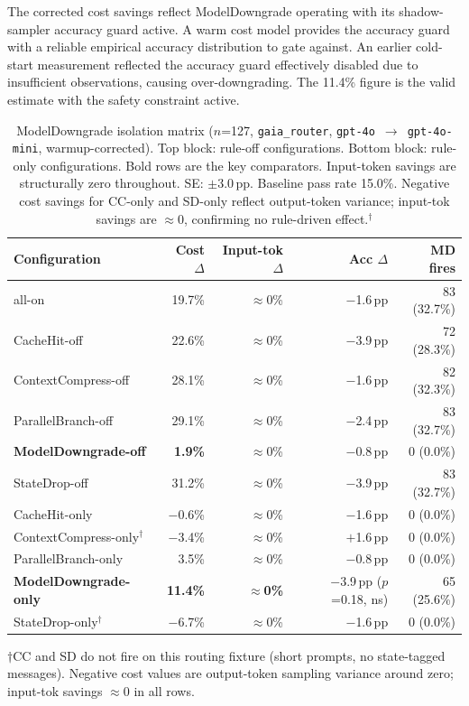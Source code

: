 The corrected cost savings reflect ModelDowngrade operating with its shadow-sampler
accuracy guard active. A warm cost model provides the accuracy guard with a reliable
empirical accuracy distribution to gate against. An earlier cold-start measurement
reflected the accuracy guard effectively disabled due to insufficient observations,
causing over-downgrading. The 11.4\% figure is the valid estimate with the safety
constraint active.

\begin{table}[t]
\caption{ModelDowngrade isolation matrix ($n$=127, \texttt{gaia\_router},
\texttt{gpt-4o}~$\rightarrow$~\texttt{gpt-4o-mini}, warmup-corrected). Top block:
rule-off configurations. Bottom block: rule-only configurations. Bold rows are the
key comparators. Input-token savings are structurally zero throughout. SE:
$\pm$3.0\,pp. Baseline pass rate 15.0\%. Negative cost savings for CC-only
and SD-only reflect output-token variance; input-tok savings are $\approx$0,
confirming no rule-driven effect.$^\dagger$}
\label{tab:md-matrix}
\small
\begin{tabular}{lrrrr}
\toprule
Configuration & Cost $\Delta$ & Input-tok $\Delta$ & Acc $\Delta$ & MD fires \\
\midrule
all-on                          & 19.7\% & $\approx$0\% & $-$1.6\,pp & 83 (32.7\%) \\
CacheHit-off                    & 22.6\% & $\approx$0\% & $-$3.9\,pp & 72 (28.3\%) \\
ContextCompress-off             & 28.1\% & $\approx$0\% & $-$1.6\,pp & 82 (32.3\%) \\
ParallelBranch-off              & 29.1\% & $\approx$0\% & $-$2.4\,pp & 83 (32.7\%) \\
\textbf{ModelDowngrade-off}     & \textbf{1.9\%} & $\approx$0\% & $-$0.8\,pp & 0 (0.0\%) \\
StateDrop-off                   & 31.2\% & $\approx$0\% & $-$3.9\,pp & 83 (32.7\%) \\
\midrule
CacheHit-only                   & $-$0.6\% & $\approx$0\% & $-$1.6\,pp & 0 (0.0\%) \\
ContextCompress-only$^\dagger$  & $-$3.4\% & $\approx$0\% & $+$1.6\,pp & 0 (0.0\%) \\
ParallelBranch-only             & 3.5\%  & $\approx$0\% & $-$0.8\,pp & 0 (0.0\%) \\
\textbf{ModelDowngrade-only}    & \textbf{11.4\%} & \textbf{$\approx$0\%} & $-$3.9\,pp ($p$=0.18, ns) & 65 (25.6\%) \\
StateDrop-only$^\dagger$        & $-$6.7\% & $\approx$0\% & $-$1.6\,pp & 0 (0.0\%) \\
\bottomrule
\end{tabular}
\footnotesize{$\dagger$CC and SD do not fire on this routing fixture (short prompts, no state-tagged messages). Negative cost values are output-token sampling variance around zero; input-tok savings $\approx$0 in all rows.}
\end{table}

